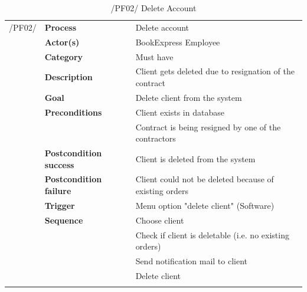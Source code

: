 \documentclass[11pt,a4paper,oneside,svgnames]{report}
\begin{document}
\begin{table}[H]
\centering
\begin{tabular}{p{1.5cm}p{3cm}p{8cm}}
\cellcolor{white}/PF02/	& \textbf{Process} & Delete account\\ 
\cellcolor{white}		& \textbf{Actor(s)} & BookExpress Employee\\ 
\cellcolor{white}		& \textbf{Category} & Must have\\
\cellcolor{white}		& \textbf{Description}	 & Client gets deleted due to resignation of the contract\\ 
\cellcolor{white}		& \textbf{Goal} & Delete client from the system\\
\cellcolor{white}		& \textbf{Preconditions} & Client exists in database\\
\cellcolor{white}		& & Contract is being resigned by one of the contractors\\
\cellcolor{white}		& \textbf{Postcondition success} & Client is deleted from the system\\
\cellcolor{white}		& \textbf{Postcondition failure} & Client could not be deleted because of existing orders\\
\cellcolor{white}		& \textbf{Trigger} & Menu option "delete client" (Software)\\
\cellcolor{white}		& \textbf{Sequence} & Choose client\\
\cellcolor{white}		& & Check if client is deletable (i.e. no existing orders)\\
\cellcolor{white}		& & Send notification mail to client\\
\cellcolor{white}		& & Delete client\\
\cellcolor{white}\hfill \\		
\end{tabular}
\caption{/PF02/ Delete Account}
\label{tab:pf02}
\end{table}
\end{document}
